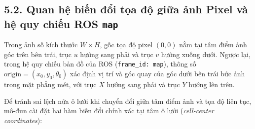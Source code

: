 
\subsection*{5.2. Quan hệ biến đổi tọa độ giữa ảnh Pixel và hệ quy chiếu ROS \texttt{map}}

Trong ảnh số kích thước $W \times H$, gốc tọa độ pixel $(0, 0)$ nằm tại tâm điểm ảnh góc trên bên trái, trục $u$ hướng sang phải và trục $v$ hướng xuống dưới. Ngược lại, trong hệ quy chiếu bản đồ của ROS (\texttt{frame\_id: map}), thông số $\text{origin} = (x_0, y_0, \theta_0)$ xác định vị trí và góc quay của góc dưới bên trái bức ảnh trong mặt phẳng mét, với trục $X$ hướng sang phải và trục $Y$ hướng lên trên.

Để tránh sai lệch nửa ô lưới khi chuyển đổi giữa tâm điểm ảnh và tọa độ liên tục, mô-đun  cài đặt hai hàm biến đổi chính xác tại tâm ô lưới (\textit{cell-center coordinates}):

